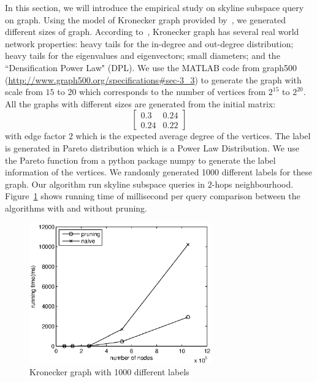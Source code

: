 In this section, we will introduce the empirical study on skyline subspace query on graph.
Using the model of Kronecker graph provided by~\cite{leskovec2005realistic}, we generated different sizes of graph.
According to~\cite{leskovec2005realistic}, Kronecker graph has several real world network properties:
heavy tails for the in-degree and out-degree distribution;
heavy tails for the eigenvalues and eigenvectors;
small diameters; and the ``Densification Power Law" (DPL).
We use the MATLAB code from graph500 (\url{http://www.graph500.org/specifications#sec-3_3}) to generate the graph with scale from $15$ to $20$ which corresponds to the number of vertices from $2^{15}$ to $2^{20}$. All the graphs with different sizes are generated from the initial matrix:
\begin{equation}
\begin{bmatrix}
0.3 & 0.24\\ 
0.24 & 0.22
\end{bmatrix}
\end{equation}
with edge factor $2$ which is the expected average degree of the vertices. The label is generated in Pareto distribution which is a Power Law Distribution. We use the Pareto function from a python package numpy to generate the label information of the vertices. We randomly generated 1000 different labels for these graph. Our algorithm run skyline subspace queries in $2$-hops neighbourhood. Figure~\ref{fig:exp:kronecker} shows running time of millisecond per query comparison between the algorithms with and without pruning.

\begin{figure}[h]
    \centering
      \includegraphics[width=0.7\textwidth]{figs/kronecker}
    \caption{\label{fig:exp:kronecker}Kronecker graph with 1000 different labels}
\end{figure}

